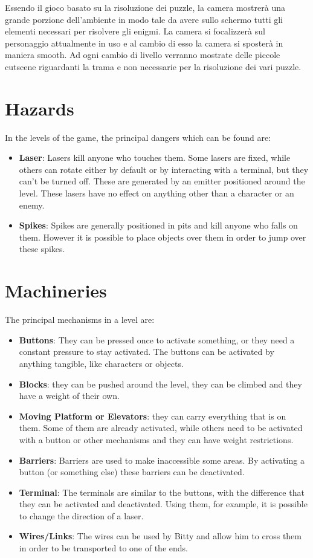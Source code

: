 \documentclass[12pt, a4paper]{report}
\begin{document}
Essendo il gioco basato su la risoluzione dei puzzle, la camera mostrerà una grande porzione dell'ambiente in modo tale da avere sullo schermo tutti gli elementi necessari per risolvere gli enigmi. La camera si focalizzerà sul personaggio attualmente in uso e al cambio di esso la camera si sposterà in maniera smooth. Ad ogni cambio di livello verranno mostrate delle piccole cutscene riguardanti la trama e non necessarie per la risoluzione dei vari puzzle.

\section*{Hazards}
In the levels of the game, the principal dangers which can be found are:
\begin{itemize}
	\item \textbf{Laser}: Lasers kill anyone who touches them. Some lasers are fixed, while others can rotate either by default or by interacting with a terminal, but they can't be turned off. These are generated by an emitter positioned around the level. These lasers have no effect on anything other than a character or an enemy.
	\item \textbf{Spikes}: Spikes are generally positioned in pits and kill anyone who falls on them. However it is possible to place objects over them in order to jump over these spikes.
\end{itemize}

\section*{Machineries}
The principal mechanisms in a level are:
\begin{itemize}
	\item \textbf{Buttons}: They can be pressed once to activate something, or they need a constant pressure to stay activated. The buttons can be activated by anything tangible, like characters or objects.
	\item \textbf{Blocks}: they can be pushed around the level, they can be climbed and they have a weight of their own.
	\item \textbf{Moving Platform or Elevators}: they can carry everything that is on them. Some of them are already activated, while others need to be activated with a button or other mechanisms and they can have weight restrictions.
	\item \textbf{Barriers}: Barriers are used to make inaccessible some areas. By activating a button (or something else) these barriers can be deactivated.
	\item \textbf{Terminal}: The terminals are similar to the buttons, with the difference that they can be activated and deactivated. Using them, for example, it is possible to change the direction of a laser.
	\item \textbf{Wires/Links}: The wires can be used by Bitty and allow him to cross them in order to be transported to one of the ends.
\end{itemize}
\end{document}

